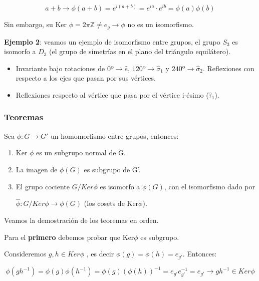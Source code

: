 \documentclass{article}
\begin{document}
 
 $$a+b \longrightarrow \phi (a+b) =e^{i(a+b)}=e^{ia}\cdot e^{ib}=\phi(a)\phi (b)$$
 
 Sin embargo, su Ker $\phi =2\pi \mathds{Z}\neq e_g \rightarrow \phi $ no es un isomorfismo.
 
 \bigskip
 \textbf{Ejemplo 2}: veamos un ejemplo de isomorfismo entre grupos, el grupo $S_3$ es isomorfo a $D_3$ (el grupo de simetrías en el plano del triángulo equilátero).
 
 \begin{itemize}
     \item Invariante bajo rotaciones de 0º$\rightarrow \hat{e}$, $120º \rightarrow \hat{\sigma}_1$ y $240º\rightarrow \hat{\sigma} _2$. Reflexiones con respecto a los ejes que pasan por sus vértices.
     
     \item  Reflexiones respecto al vértice que pasa por el vértice i-ésimo ($\hat{\tau}_1$).
 \end{itemize}
 
 \subsubsection{Teoremas}
 
 Sea $\phi : G\rightarrow G'$ un homomorfismo entre grupos, entonces:
      
      \begin{enumerate}
\item Ker $\phi$ es un subgrupo normal de G.

\item La imagen de $\phi (G)$ es subgrupo de G'.

\item El grupo cociente $G/Ker\phi$ es isomorfo a $\phi (G)$, con el isomorfismo dado por

$\hat{\phi} : G/Ker\phi \rightarrow \phi (G)$ (los cosets de Ker$\phi$).

 \end{enumerate}
 
 Veamos la demostración de los teoremas en orden. 
 
 \bigskip
 Para el \textbf{primero} debemos probar que Ker$\phi$ es subgrupo.
 
 \smallskip
 Consideremos $g,h\in Ker\phi $ , es decir $\phi (g) =\phi (h)=e_{g'}$. Entonces:
 
 $$\phi (gh^{-1})=\phi (g)\phi (h^{-1})=\phi (g)(\phi(h))^{-1}=e_{g'}e_{g'}^{-1}=e_{g'} \rightarrow gh^{-1} \in Ker \phi $$
 
\end{document}
